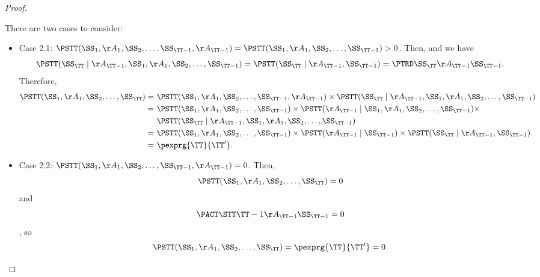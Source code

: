 \begin{proof}
\begin{itemize}
      There are two cases to consider:
      \begin{itemize}
        \item Case 2.1: $\ismid = \isa > 0$.
          Then, 
          and we have
          $$\iscf = \isc = \istrd.$$
          Therefore,
          \begin{align*}
            \isjoint =\ & \ismid \times \iscf\\
                     =\ & \isa \times \isbf \times\\& \iscf\\
            =\ & \isa \times \isb \times \isc\\
            =\ & \pexprg{\TT}{\TT'}.
          \end{align*}
        \item Case 2.2: $\ismid = 0$.
          Then,
          $$\isjoint = 0$$
          and
          $$\isact = 0$$,
          so
          $$\isjoint = \pexprg{\TT}{\TT'} = 0.$$
      \end{itemize}
  \end{itemize}
\end{proof}
